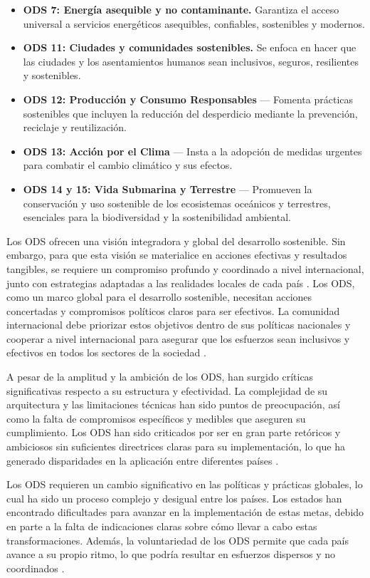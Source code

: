 \documentclass[main.tex]{subfiles}
\begin{document}
\begin{itemize}
	\item \textbf{ODS 7: Energía asequible y no contaminante.} Garantiza el acceso universal a servicios energéticos asequibles, confiables, sostenibles y modernos.
    \item \textbf{ODS 11: Ciudades y comunidades sostenibles.} Se enfoca en hacer que las ciudades y los asentamientos humanos sean inclusivos, seguros, resilientes y sostenibles.
    \item \textbf{ODS 12: Producción y Consumo Responsables} — Fomenta prácticas sostenibles que incluyen la reducción del desperdicio mediante la prevención, reciclaje y reutilización.
    \item \textbf{ODS 13: Acción por el Clima} — Insta a la adopción de medidas urgentes para combatir el cambio climático y sus efectos.
    \item \textbf{ODS 14 y 15: Vida Submarina y Terrestre} — Promueven la conservación y uso sostenible de los ecosistemas oceánicos y terrestres, esenciales para la biodiversidad y la sostenibilidad ambiental.
\end{itemize}

Los ODS ofrecen una visión integradora y global del desarrollo sostenible. Sin embargo, para que esta visión se materialice en acciones efectivas y resultados tangibles, se requiere un compromiso profundo y coordinado a nivel internacional, junto con estrategias adaptadas a las realidades locales de cada país \cite{gil2018objetivos}.
Los ODS, como un marco global para el desarrollo sostenible, necesitan acciones concertadas y compromisos políticos claros para ser efectivos. La comunidad internacional debe priorizar estos objetivos dentro de sus políticas nacionales y cooperar a nivel internacional para asegurar que los esfuerzos sean inclusivos y efectivos en todos los sectores de la sociedad \cite{onu2024ods}.

A pesar de la amplitud y la ambición de los ODS, han surgido críticas significativas respecto a su estructura y efectividad. La complejidad de su arquitectura y las limitaciones técnicas han sido puntos de preocupación, así como la falta de compromisos específicos y medibles que aseguren su cumplimiento. Los ODS han sido criticados por ser en gran parte retóricos y ambiciosos sin suficientes directrices claras para su implementación, lo que ha generado disparidades en la aplicación entre diferentes países \cite{gil2018objetivos}.

Los ODS requieren un cambio significativo en las políticas y prácticas globales, lo cual ha sido un proceso complejo y desigual entre los países. Los estados han encontrado dificultades para avanzar en la implementación de estas metas, debido en parte a la falta de indicaciones claras sobre cómo llevar a cabo estas transformaciones. Además, la voluntariedad de los ODS permite que cada país avance a su propio ritmo, lo que podría resultar en esfuerzos dispersos y no coordinados \cite{gil2018objetivos}.
\end{document}
